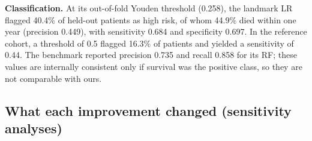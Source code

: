 \textbf{Classification.} At its out-of-fold Youden threshold (0.258), the
landmark LR flagged 40.4\% of held-out patients as high risk, of whom 44.9\%
died within one year (precision 0.449), with sensitivity 0.684 and specificity
0.697. In the reference cohort, a threshold of 0.5 flagged 16.3\% of patients
and yielded a sensitivity of 0.44. The benchmark reported precision 0.735 and
recall 0.858 for its RF; these values are internally consistent only if survival
was the positive class, so they are not comparable with ours.

\hypertarget{what-each-improvement-changed-sensitivity-analyses}{%
\subsection{What each improvement changed (sensitivity
analyses)}\label{what-each-improvement-changed-sensitivity-analyses}}

